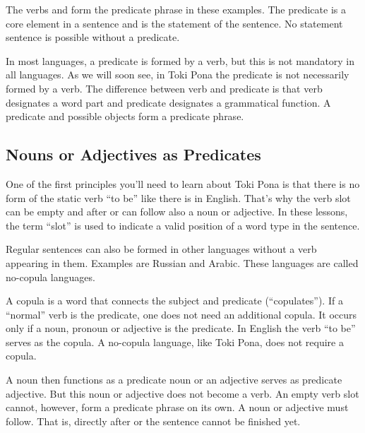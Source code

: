The verbs  and  form the predicate phrase in these examples.
The predicate is a core element in a sentence and is the statement of the sentence.
No statement sentence is possible without a predicate.

In most languages, a predicate is formed by a verb, but this is not mandatory in all languages.
As we will soon see, in Toki Pona the predicate is not necessarily formed by a verb.
The difference between verb and predicate is that verb designates a word part and predicate designates a grammatical function.
A predicate and possible objects form a predicate phrase.

\subsection*{Nouns or Adjectives as Predicates}

One of the first principles you'll need to learn about Toki Pona is that there is no form of the static verb ``to be'' like there is in English.
That's why the verb slot can be empty and after  or  can follow also a noun or adjective.
In these lessons, the term ``slot'' is used to indicate a valid position of a word type in the sentence.

Regular sentences can also be formed in other languages without a verb appearing in them.
Examples are Russian and Arabic.
These languages are called no-copula languages.

A copula is a word that connects the subject and predicate (``copulates'').
If a ``normal'' verb is the predicate, one does not need an additional copula.
It occurs only if a noun, pronoun or adjective is the predicate.
In English the verb ``to be'' serves as the copula.
A no-copula language, like Toki Pona, does not require a copula.

A noun then functions as a predicate noun or an adjective serves as predicate adjective.
But this noun or adjective does not become a verb.
An empty verb slot cannot, however, form a predicate phrase on its own.
A noun or adjective must follow.
That is, directly after  or  the sentence cannot be finished yet.

